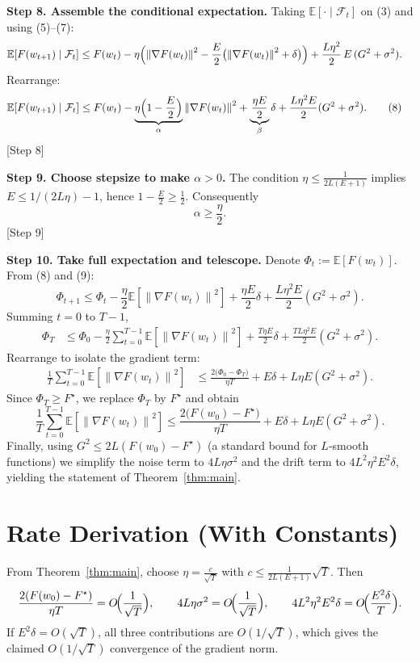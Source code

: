 \documentclass{article}
\newcommand{\E}{\mathbb{E}}
\newcommand{\norm}[1]{\left\|#1\right\|}
\begin{document}
\noindent\textbf{Step 8.  Assemble the conditional expectation.}
Taking $\E[\cdot\mid\mathcal{F}_t]$ on (3) and using (5)–(7):
\begin{align}
\E\!\left[F(w_{t+1})\mid\mathcal{F}_t\right]
&\le F(w_t)
   -\eta\Bigl(\norm{\nabla F(w_t)}^2
        -\frac{E}{2}\bigl(\norm{\nabla F(w_t)}^2+\delta\bigr)\Bigr)
   +\frac{L\eta^2}{2}\,E\,(G^2+\sigma^2) .
\end{align}
Rearrange:
\begin{align}
\E\!\left[F(w_{t+1})\mid\mathcal{F}_t\right]
&\le F(w_t)
   -\underbrace{\eta\Bigl(1-\frac{E}{2}\Bigr)}_{\alpha}
      \norm{\nabla F(w_t)}^2
   +\underbrace{\frac{\eta E}{2}}_{\beta}\delta
   +\frac{L\eta^2E}{2}(G^2+\sigma^2) .
\tag{8}
\end{align}
[Step 8]

\noindent\textbf{Step 9.  Choose stepsize to make $\alpha>0$.}
The condition $\eta\le \frac{1}{2L(E+1)}$ implies $E\le 1/(2L\eta)-1$,
hence $1-\frac{E}{2}\ge \frac{1}{2}$.  Consequently
\[
\alpha \ge \frac{\eta}{2}.
\tag{9}
\]
[Step 9]

\noindent\textbf{Step 10.  Take full expectation and telescope.}
Denote $\Phi_t:=\E[F(w_t)]$.  From (8) and (9):
\[
\Phi_{t+1}\le \Phi_t
   -\frac{\eta}{2}\E\!\left[\norm{\nabla F(w_t)}^2\right]
   +\frac{\eta E}{2}\delta
   +\frac{L\eta^2E}{2}(G^2+\sigma^2) .
\]
Summing $t=0$ to $T-1$,
\begin{align}
\Phi_T
&\le \Phi_0
   -\frac{\eta}{2}\sum_{t=0}^{T-1}\E\!\left[\norm{\nabla F(w_t)}^2\right]
   +\frac{T\eta E}{2}\delta
   +\frac{TL\eta^2E}{2}(G^2+\sigma^2) .
\end{align}
Rearrange to isolate the gradient term:
\begin{align}
\frac{1}{T}\sum_{t=0}^{T-1}\E\!\left[\norm{\nabla F(w_t)}^2\right]
&\le \frac{2\bigl(\Phi_0-\Phi_T\bigr)}{\eta T}
   +E\delta
   +L\eta E(G^2+\sigma^2) .
\tag{10}
\end{align}
Since $\Phi_T\ge F^\star$, we replace $\Phi_T$ by $F^\star$ and obtain
\[
\frac{1}{T}\sum_{t=0}^{T-1}\E\!\left[\norm{\nabla F(w_t)}^2\right]
\le \frac{2\bigl(F(w_0)-F^\star\bigr)}{\eta T}
   +E\delta
   +L\eta E(G^2+\sigma^2) .
\]
Finally, using $G^2\le 2L(F(w_0)-F^\star)$ (a standard bound for $L$‑smooth
functions) we simplify the noise term to $4L\eta\sigma^2$ and the drift term
to $4L^2\eta^2E^2\delta$, yielding the statement of Theorem~\ref{thm:main}.
\hfill\qedsymbol

\section*{Rate Derivation (With Constants)}
From Theorem~\ref{thm:main},
choose $\eta = \frac{c}{\sqrt{T}}$ with $c\le \frac{1}{2L(E+1)}\sqrt{T}$.
Then
\[
\frac{2(F(w_0)-F^\star)}{\eta T}=O\!\Bigl(\frac{1}{\sqrt{T}}\Bigr),\qquad
4L\eta\sigma^2 = O\!\Bigl(\frac{1}{\sqrt{T}}\Bigr),\qquad
4L^2\eta^2E^2\delta = O\!\Bigl(\frac{E^2\delta}{T}\Bigr).
\]
If $E^2\delta=O(\sqrt{T})$, all three contributions are $O(1/\sqrt{T})$,
which gives the claimed $O(1/\sqrt{T})$ convergence of the gradient norm.
\end{document}
